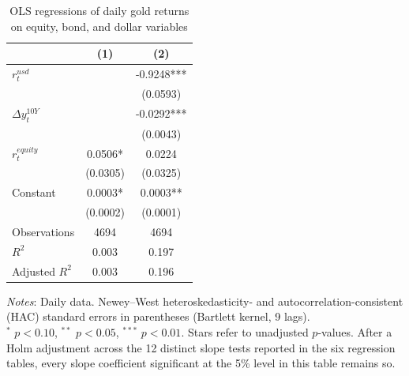 \begin{table}[H]
\centering
\caption{OLS regressions of daily gold returns on equity, bond, and dollar variables}
\label{tab:ols_gold_equity}
\begin{tabular}{lcc}
\toprule
 & (1) & (2) \\
\midrule
$r^{usd}_t$ &  & -0.9248*** \\
 &  & (0.0593) \\
$\Delta y^{10Y}_t$ &  & -0.0292*** \\
 &  & (0.0043) \\
$r^{equity}_t$ & 0.0506* & 0.0224 \\
 & (0.0305) & (0.0325) \\
Constant & 0.0003* & 0.0003** \\
 & (0.0002) & (0.0001) \\
Observations & 4694 & 4694 \\
$R^2$ & 0.003 & 0.197 \\
Adjusted $R^2$ & 0.003 & 0.196 \\
\bottomrule
\end{tabular}

\vspace{0.2cm}
\begin{minipage}{0.9\textwidth}
\footnotesize
\textit{Notes}: Daily data. Newey--West heteroskedasticity- and autocorrelation-consistent (HAC) standard errors in parentheses (Bartlett kernel, 9 lags).\\
$^*$ $p<0.10$, $^{**}$ $p<0.05$, $^{***}$ $p<0.01$. Stars refer to unadjusted $p$-values. After a Holm adjustment across the 12 distinct slope tests reported in the six regression tables, every slope coefficient significant at the 5\% level in this table remains so.
\end{minipage}
\end{table}
